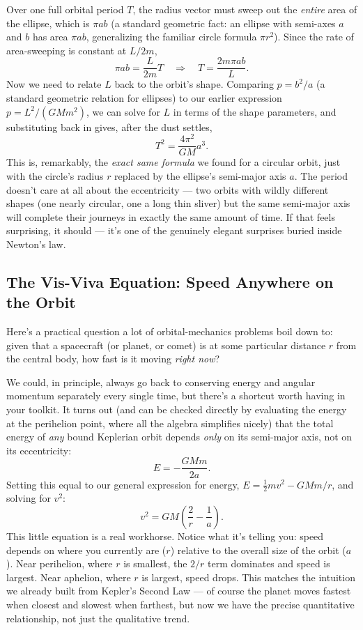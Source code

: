 \documentclass[11pt]{article}
\begin{document}
Over one full orbital period $T$, the radius vector must sweep out the \emph{entire} area of the
ellipse, which is $\pi ab$ (a standard geometric fact: an ellipse with semi-axes $a$ and $b$ has
area $\pi ab$, generalizing the familiar circle formula $\pi r^2$). Since the rate of area-sweeping
is constant at $L/2m$,
\[
\pi ab = \frac{L}{2m}T \quad\Longrightarrow\quad T = \frac{2m\pi ab}{L}.
\]
Now we need to relate $L$ back to the orbit's shape. Comparing $p=b^2/a$ (a standard geometric
relation for ellipses) to our earlier expression $p=L^2/(GMm^2)$, we can solve for $L$ in terms of
the shape parameters, and substituting back in gives, after the dust settles,
\[
\boxed{T^2 = \frac{4\pi^2}{GM}a^3.}
\]
This is, remarkably, the \emph{exact same formula} we found for a circular orbit, just with the
circle's radius $r$ replaced by the ellipse's semi-major axis $a$. The period doesn't care at all
about the eccentricity --- two orbits with wildly different shapes (one nearly circular, one a
long thin sliver) but the same semi-major axis will complete their journeys in exactly the same
amount of time. If that feels surprising, it should --- it's one of the genuinely elegant surprises
buried inside Newton's law.

\subsection{The Vis-Viva Equation: Speed Anywhere on the Orbit}

Here's a practical question a lot of orbital-mechanics problems boil down to: given that a
spacecraft (or planet, or comet) is at some particular distance $r$ from the central body, how
fast is it moving \emph{right now}?

We could, in principle, always go back to conserving energy and angular momentum separately every
single time, but there's a shortcut worth having in your toolkit. It turns out (and can be checked
directly by evaluating the energy at the perihelion point, where all the algebra simplifies nicely)
that the total energy of \emph{any} bound Keplerian orbit depends \emph{only} on its semi-major
axis, not on its eccentricity:
\[
E = -\frac{GMm}{2a}.
\]
Setting this equal to our general expression for energy, $E=\frac12mv^2-GMm/r$, and solving for
$v^2$:
\[
\boxed{v^2 = GM\left(\frac2r-\frac1a\right).}
\]
This little equation is a real workhorse. Notice what it's telling you: speed depends on where you
currently are ($r$) relative to the overall size of the orbit ($a$). Near perihelion, where $r$ is
smallest, the $2/r$ term dominates and speed is largest. Near aphelion, where $r$ is largest, speed
drops. This matches the intuition we already built from Kepler's Second Law --- of course the
planet moves fastest when closest and slowest when farthest, but now we have the precise
quantitative relationship, not just the qualitative trend.
\end{document}
